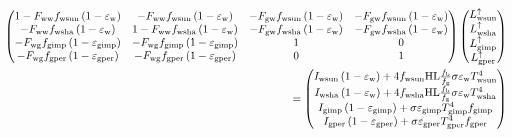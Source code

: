 \begin{landscape}
  \begin{equation}
    \begin{aligned}
      \left(\begin{matrix}1-F_{\mathrm{ww}}f_{\mathrm{wsun}}\left(1-\varepsilon_{\rm w}\right)&-F_{\mathrm{ww}}f_{\mathrm{wsun}}\left(1-\varepsilon_{\rm w}\right)&-F_{\mathrm{gw}}f_{\mathrm{wsun}}\left(1-\varepsilon_{\rm w}\right)&-F_{\mathrm{gw}}f_{\mathrm{wsun}}\left(1-\varepsilon_{\rm w}\right)\\-F_{\mathrm{ww}}f_{\mathrm{wsha}}\left(1-\varepsilon_{\rm w}\right)&1-F_{\mathrm{ww}}f_{\mathrm{wsha}}\left(1-\varepsilon_{\rm w}\right)&-F_{\mathrm{gw}}f_{\mathrm{wsha}}\left(1-\varepsilon_{\rm w}\right)&-F_{\mathrm{gw}}f_{\mathrm{wsha}}\left(1-\varepsilon_{\rm w}\right)\\-F_{\mathrm{wg}}f_{\mathrm{gimp}}\left(1-\varepsilon_{\mathrm{gimp}}\right)&-F_{\mathrm{wg}}f_{\mathrm{gimp}}\left(1-\varepsilon_{\mathrm{gimp}}\right)&1&0\\-F_{\mathrm{wg}}f_{\mathrm{gper}}\left(1-\varepsilon_{\mathrm{gper}}\right)&-F_{\mathrm{wg}}f_{\mathrm{gper}}\left(1-\varepsilon_{\mathrm{gper}}\right)&0&1\\\end{matrix}\right)
      \left(\begin{matrix}L_{\mathrm{wsun}}^\uparrow\\L_{\mathrm{wsha}}^\uparrow\\L_{\mathrm{gimp}}^\uparrow\\L_{\mathrm{gper}}^\uparrow\\\end{matrix}\right)\\
      =\left(\begin{matrix}I_{\mathrm{wsun}}\left(1-\varepsilon_{\rm w}\right)+4f_{\mathrm{wsun}} {\rm HL} \frac{f_{\rm b}}{f_{\rm g}} \sigma\varepsilon_{\rm w}T_{\mathrm{wsun}}^4\\I_{\mathrm{wsha}}\left(1-\varepsilon_{\rm w}\right)+4f_{\mathrm{wsha}} {\rm HL} \frac{f_{\rm b}}{f_{\rm g}} \sigma\varepsilon_{\rm w}T_{\mathrm{wsha}}^4\\I_{\mathrm{gimp}}\left(1-\varepsilon_{\mathrm{gimp}}\right)+\sigma\varepsilon_{\mathrm{gimp}}T_{\mathrm{gimp}}^4f_{\mathrm{gimp}}\\I_{\mathrm{gper}}\left(1-\varepsilon_{\mathrm{gper}}\right)+\sigma\varepsilon_{\mathrm{gper}}T_{\mathrm{gper}}^4f_{\mathrm{gper}}\\\end{matrix}\right)
    \end{aligned}
  \end{equation}
\end{landscape}

